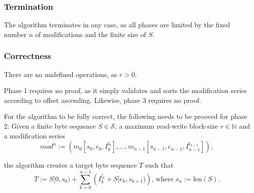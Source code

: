 \documentclass[english, 10pt, openright, twocolumn, landscape, twoside, notitlepage, a4paper, pdftex]		
{article}
\begin{document}
\subsubsection{Termination}%
\label{sec:Termination}%

The algorithm terminates in any case, as all phases are limited by the fixed number $n$ of modifications and the finite size of $S$.

\subsubsection{Correctness}%
\label{sec:Correctness}%

There are no undefined operations, as $r>0$.

Phase 1 requires no proof, as it simply validates and sorts the modification series according to offset ascending. Likewise, phase 3 requires no proof.

For the algorithm to be fully correct, the following needs to be prooved for phase 2: Given a finite byte sequence $S\in\mathcal{S}$, a maximum read-write block-size $r\in\mathbb{N}$ and a modification series 
\[\overline{mod^{n}}:=\left(m_{0}[s_{0}, e_{0}, I_{0}^{l_{0}}],\ldots,m_{n-1}[s_{n-1}, e_{n-1}, I_{n-1}^{l_{n-1}}]\right),\] 

the algorithm creates a target byte sequence $T$ such that
\[T:=S[0,s_{0})+\sum_{k=0}^{n-1}{\left(I_{k}^{l_{k}}+S[e_{k},s_{k+1})\right)}\text{, where }s_{n}:=\text{len}(S).\]
\end{document}
